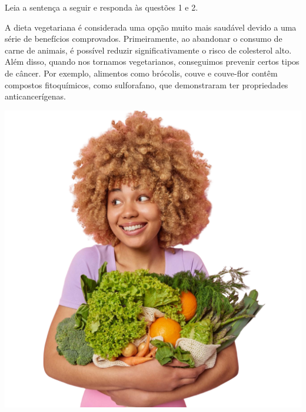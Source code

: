 Leia a sentença a seguir e responda às questões 1 e 2. 

\begin{myquote}

\begin{minipage}{0.7\textwidth}
A dieta vegetariana é considerada uma opção muito mais saudável devido a uma
série de benefícios comprovados. Primeiramente, ao abandonar o consumo de
carne de animais, é possível reduzir significativamente o risco de colesterol
alto. Além disso, quando nos tornamos vegetarianos, conseguimos prevenir
certos tipos de câncer. Por exemplo, alimentos como brócolis, couve e
couve-flor contêm compostos fitoquímicos, como sulforafano, que demonstraram
ter propriedades anticancerígenas.
\end{minipage}
\hfill
\begin{minipage}{0.4\textwidth}
  \centering
  \includegraphics[width=\textwidth]{./imgSAEB_7_POR/media/image25.png}
\end{minipage}



\end{myquote}

